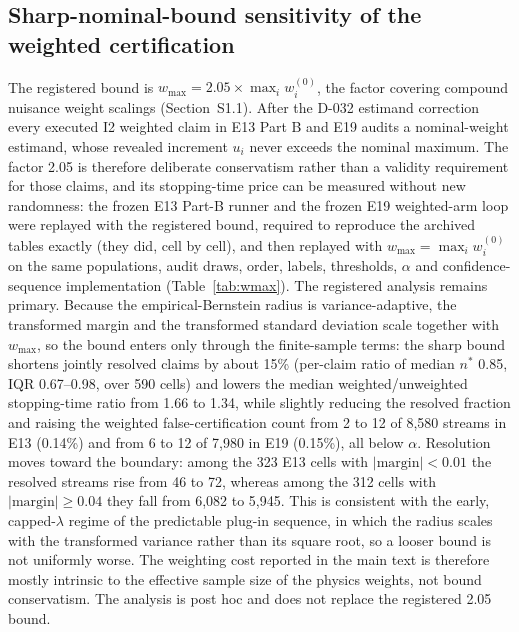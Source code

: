 \documentclass[11pt,a4paper]{article}
\begin{document}
\subsection{Sharp-nominal-bound sensitivity of the weighted certification}
\label{supp:wmax}

The registered bound is $w_{\max}=2.05\times\max_i w_i^{(0)}$, the factor
covering compound nuisance weight scalings (Section~S1.1). After the D-032
estimand correction every executed I2 weighted claim in E13 Part B and E19
audits a nominal-weight estimand, whose revealed increment $u_i$ never exceeds
the nominal maximum. The factor 2.05 is therefore deliberate conservatism
rather than a validity requirement for those claims, and its stopping-time
price can be measured without new randomness: the frozen E13 Part-B runner and
the frozen E19 weighted-arm loop were replayed with the registered bound,
required to reproduce the archived tables exactly (they did, cell by cell),
and then replayed with $w_{\max}=\max_i w_i^{(0)}$ on the same populations,
audit draws, order, labels, thresholds, $\alpha$ and confidence-sequence
implementation (Table~\ref{tab:wmax}). The registered analysis remains
primary. Because the empirical-Bernstein radius is variance-adaptive, the
transformed margin and the transformed standard deviation scale together with
$w_{\max}$, so the bound enters only through the finite-sample terms: the
sharp bound shortens jointly resolved claims by about 15\% (per-claim ratio of
median $n^*$ 0.85, IQR 0.67--0.98, over 590 cells) and lowers the median
weighted/unweighted stopping-time ratio from 1.66 to 1.34, while slightly
reducing the resolved fraction and raising the weighted false-certification
count from 2 to 12 of 8,580 streams in E13 (0.14\%) and from 6 to 12 of 7,980
in E19 (0.15\%), all below $\alpha$. Resolution moves toward the boundary:
among the 323 E13 cells with $|\mathrm{margin}|<0.01$ the resolved streams
rise from 46 to 72, whereas among the 312 cells with $|\mathrm{margin}|\geq0.04$
they fall from 6,082 to 5,945. This is consistent with the early, capped-$\lambda$
regime of the predictable plug-in sequence, in which the radius scales with the
transformed variance rather than its square root, so a looser bound is not
uniformly worse. The weighting cost reported in the main
text is therefore mostly intrinsic to the effective sample size of the
physics weights, not bound conservatism. The analysis is post hoc and does not
replace the registered 2.05 bound.
\end{document}
